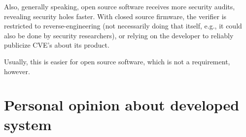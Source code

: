 Also, generally speaking, open source software receives more security audits, revealing security holes faster.
With closed source firmware, the verifier is restricted to reverse-engineering (not necessarily doing that itself, e.g., it could also be done by security researchers), or relying on the developer to reliably publicize CVE's about its product.

Usually, this is easier for open source software, which is not a requirement, however.


\section{Personal opinion about developed system}


